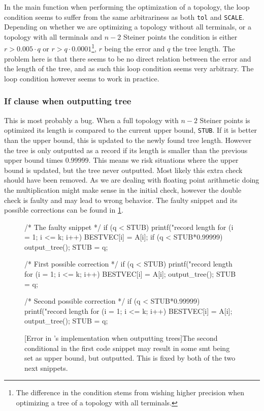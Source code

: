 In the main function when performing the optimization of a topology, the loop
condition seems to suffer from the same arbitrariness as both \texttt{tol} and
\texttt{SCALE}. Depending on whether we are optimizing a topology without all
terminals, or a topology with all terminals and $n-2$ Steiner points the
condition is either $r > 0.005 \cdot q$ or $r > q \cdot 0.0001$\footnote{The
  difference in the condition stems from wishing higher precision when
  optimizing a tree of a topology with all terminals.}, $r$ being the error and
$q$ the tree length. The problem here is that there seems to be no direct relation
between the error and the length of the tree, and as such this loop condition
seems very arbitrary. The loop condition however seems to work in practice.

\subsubsection{If clause when outputting tree}
\label{sec:if-clause-when}

This is most probably a bug. When a full topology with $n-2$ Steiner points is
optimized its length is compared to the current upper bound, \texttt{STUB}. If
it is better than the upper bound, this is updated to the newly found tree
length. However the tree is only outputted as a record if its length is smaller
than the previous upper bound times $0.99999$. This means we risk situations
where the upper bound is updated, but the tree never outputted. Most likely
this extra check should have been removed. As we are dealing with floating
point arithmetic doing the multiplication might make sense in the initial check,
however the double check is faulty and may lead to wrong behavior. The faulty
snippet and its possible corrections can be found in \cref{fig:if-clause-snippet}.

\begin{figure}[htbp]
\begin{c-code}
/* The faulty snippet */
if (q < STUB) {
  printf("\nnew record length %
  for (i = 1; i <= k; i++) BESTVEC[i] = A[i];
  if (q < STUB*0.99999) output_tree();
  STUB = q;
}

/* First possible correction */
if (q < STUB) {
  printf("\nnew record length %
  for (i = 1; i <= k; i++) BESTVEC[i] = A[i];
  output_tree();
  STUB = q;
}

/* Second possible correction */
if (q < STUB*0.99999) {
  printf("\nnew record length %
  for (i = 1; i <= k; i++) BESTVEC[i] = A[i];
  output_tree();
  STUB = q;
}
\end{c-code}
  [Error in \citeauthor{smith1992}'s implementation when outputting trees]{The
    second conditional in the first code snippet may result in some \ac{smt}
    being set as upper bound, but outputted. This is fixed by both of the two
    next snippets.\label{fig:if-clause-snippet}}
\end{figure}

\chapterbreak{}

